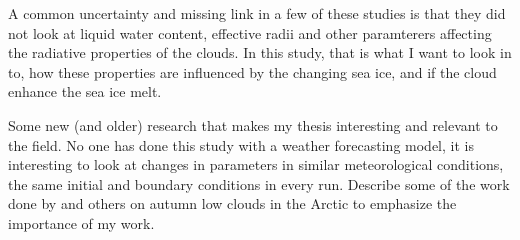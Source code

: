 A common uncertainty and missing link in a few of these studies is that they did not look at liquid water content, effective radii and other paramterers affecting the radiative properties of the clouds. In this study, that is what I want to look in to, how these properties are influenced by the changing sea ice, and if the cloud enhance the sea ice melt.

Some new (and older) research that makes my thesis interesting and relevant to the field. No one has done this study with a weather forecasting model, it is interesting to look at changes in parameters in similar meteorological conditions, the same initial and boundary conditions in every run.
Describe some of the work done by \citet{Palm2010, Wu2012} and others on autumn low clouds in the Arctic to emphasize the importance of my work.





